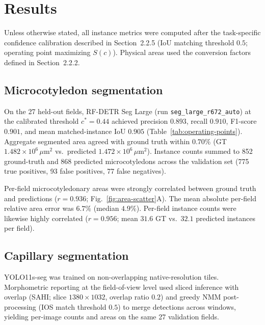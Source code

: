 
\section{Results}

Unless otherwise stated, all instance metrics were computed after the task-specific confidence calibration described in Section~2.2.5 (IoU matching threshold $0.5$; operating point maximizing $S(c)$). Physical areas used the conversion factors defined in Section~2.2.2.

\subsection{Microcotyledon segmentation}

On the 27 held-out fields, RF-DETR Seg Large (run \texttt{seg\_large\_r672\_auto}) at the calibrated threshold $c^{*}=0.44$ achieved precision $0.893$, recall $0.910$, F1-score $0.901$, and mean matched-instance IoU $0.905$ (Table~\ref{tab:operating-points}). Aggregate segmented area agreed with ground truth within $0.70\%$ (GT $1.482\times10^{6}\,\mu\mathrm{m}^{2}$ vs.\ predicted $1.472\times10^{6}\,\mu\mathrm{m}^{2}$). Instance counts summed to 852 ground-truth and 868 predicted microcotyledons across the validation set (775 true positives, 93 false positives, 77 false negatives).

Per-field microcotyledonary areas were strongly correlated between ground truth and predictions ($r=0.936$; Fig.~\ref{fig:area-scatter}A). The mean absolute per-field relative area error was $6.7\%$ (median $4.9\%$). Per-field instance counts were likewise highly correlated ($r=0.956$; mean $31.6$ GT vs.\ $32.1$ predicted instances per field).


\subsection{Capillary segmentation}

YOLO11s-seg was trained on non-overlapping native-resolution tiles. Morphometric reporting at the field-of-view level used sliced inference with overlap (SAHI; slice $1380\times1032$, overlap ratio $0.2$) and greedy NMM post-processing (IOS match threshold $0.5$) to merge detections across windows, yielding per-image counts and areas on the same 27 validation fields.

